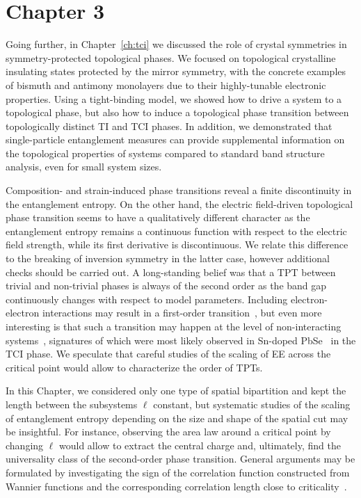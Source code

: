 \section*{Chapter 3}
\noindent Going further, in Chapter~\ref{ch:tci} we discussed the role of crystal symmetries in symmetry-protected topological phases. We focused on topological crystalline insulating states protected by the mirror symmetry, with the concrete examples of bismuth and antimony monolayers due to their highly-tunable electronic properties. Using a tight-binding model, we showed how to drive a system to a topological phase, but also how to induce a topological phase transition between topologically distinct TI and TCI phases. In addition, we demonstrated that single-particle entanglement measures can provide supplemental information on the topological properties of systems compared to standard band structure analysis, even for small system sizes.

Composition- and strain-induced phase transitions reveal a finite discontinuity in the entanglement entropy. On the other hand, the electric field-driven topological phase transition seems to have a qualitatively different character as the entanglement entropy remains a continuous function with respect to the electric field strength, while its first derivative is discontinuous. We relate this difference to the breaking of inversion symmetry in the latter case, however additional checks should be carried out. A long-standing belief was that a TPT between trivial and non-trivial phases is always of the second order as the band gap continuously changes with respect to model parameters. Including electron-electron interactions may result in a first-order transition~\cite{PhysRevLett.114.185701, PhysRevB.94.041101, PhysRevB.94.035109}, but even more interesting is that such a transition may happen at the level of non-interacting systems~\cite{PhysRevB.95.161403}, signatures of which were most likely observed in Sn-doped PbSe~\cite{PhysRevB.90.161202} in the TCI phase. We speculate that careful studies of the scaling of EE across the critical point would allow to characterize the order of TPTs.

In this Chapter, we considered only one type of spatial bipartition and kept the length between the subsystems $\ell$ constant, but systematic studies of the scaling of entanglement entropy depending on the size and shape of the spatial cut may be insightful. For instance, observing the area law around a critical point by changing $\ell$ would allow to extract the central charge and, ultimately, find the universality class of the second-order phase transition. General arguments may be formulated by investigating the sign of the correlation function constructed from Wannier functions and the corresponding correlation length close to criticality~\cite{PhysRevB.95.075116}.

